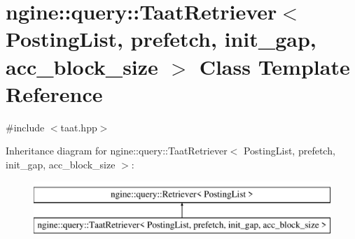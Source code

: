 \hypertarget{classngine_1_1query_1_1TaatRetriever}{}\section{ngine\+:\+:query\+:\+:Taat\+Retriever$<$ Posting\+List, prefetch, init\+\_\+gap, acc\+\_\+block\+\_\+size $>$ Class Template Reference}
\label{classngine_1_1query_1_1TaatRetriever}


{\ttfamily \#include $<$taat.\+hpp$>$}

Inheritance diagram for ngine\+:\+:query\+:\+:Taat\+Retriever$<$ Posting\+List, prefetch, init\+\_\+gap, acc\+\_\+block\+\_\+size $>$\+:\begin{figure}[H]
\begin{center}
\leavevmode
\includegraphics[height=2.000000cm]{classngine_1_1query_1_1TaatRetriever}
\end{center}
\end{figure}
